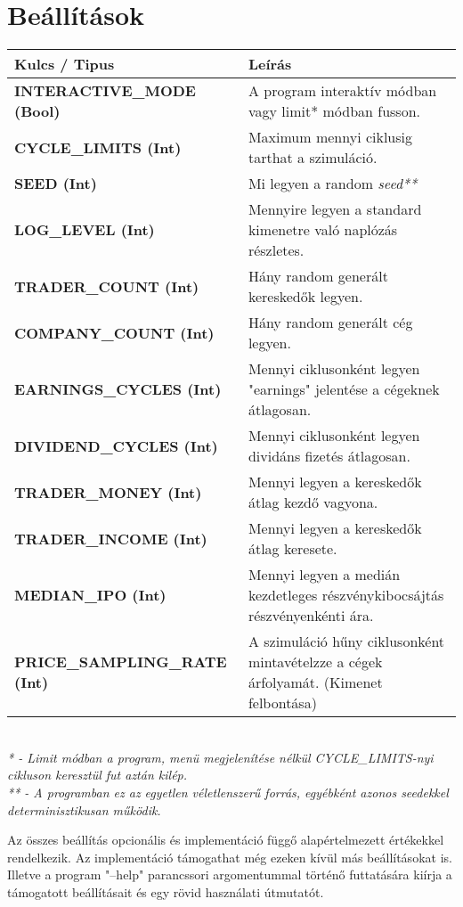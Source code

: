 \documentclass{article}[12pt,a4paper]
\begin{document}
    \section{Beállítások}
    \begin{center}
        \begin{tabular}{ | p{5.5cm} || p{5.5cm} | }
            \hline
            \textbf{Kulcs / Tipus} & Leírás \\
            \hline
            \textbf{INTERACTIVE\_MODE (Bool)} & A program interaktív módban vagy limit* módban fusson.\\
            \hline
            \textbf{CYCLE\_LIMITS (Int)} & Maximum mennyi ciklusig tarthat a szimuláció.\\
            \hline
            \textbf{SEED (Int)} & Mi legyen a random \textit{seed**}\\
            \hline
            \textbf{LOG\_LEVEL (Int)} & Mennyire legyen a standard kimenetre való naplózás részletes.\\
            \hline
            \textbf{TRADER\_COUNT (Int)} & Hány random generált kereskedők legyen.\\
            \hline
            \textbf{COMPANY\_COUNT (Int)} & Hány random generált cég legyen.\\
            \hline
            \textbf{EARNINGS\_CYCLES (Int)} & Mennyi ciklusonként legyen "earnings" jelentése a cégeknek átlagosan.\\
            \hline
            \textbf{DIVIDEND\_CYCLES (Int)} & Mennyi ciklusonként legyen dividáns fizetés átlagosan.\\
            \hline
            \textbf{TRADER\_MONEY (Int)} & Mennyi legyen a kereskedők átlag kezdő vagyona.\\
            \hline
            \textbf{TRADER\_INCOME (Int)} & Mennyi legyen a kereskedők átlag keresete.\\
            \hline
            \textbf{MEDIAN\_IPO (Int)} & Mennyi legyen a medián kezdetleges részvénykibocsájtás részvényenkénti ára.\\
            \hline
            \textbf{PRICE\_SAMPLING\_RATE (Int)} & A szimuláció hűny ciklusonként mintavételzze a cégek árfolyamát. (Kimenet felbontása)\\
            \hline
        \end{tabular}\\
        \textit{* - Limit módban a program, menü megjelenítése nélkül CYCLE\_LIMITS-nyi cikluson keresztül fut aztán kilép.} \\
        \textit{** - A programban ez az egyetlen véletlenszerű forrás, egyébként azonos seedekkel determinisztikusan működik.}
    \end{center}
    Az összes beállítás opcionális és implementáció függő alapértelmezett értékekkel rendelkezik.
    Az implementáció támogathat még ezeken kívül más beállításokat is.
    Illetve a program "--help" parancssori argomentummal történő futtatására kiírja a támogatott beállításait és egy rövid használati útmutatót.
\end{document}
